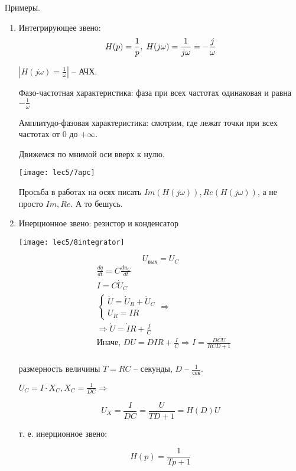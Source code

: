 \documentclass[main.tex]{subfiles}
\begin{document}
Примеры.

\begin{enumerate}[noitemsep]
	\item Интегрирующее звено:
    $$ H(p) = \frac{1}{p}, \thickspace H(j \omega) = \frac{1}{j \omega} = - \frac{j}{\omega} $$

    $|H(j \omega) = \frac{1}{\omega}|$ -- АЧХ.

    Фазо-частотная характеристика: фаза при всех частотах одинаковая и равна $ - \frac{1}{\omega} $

    Амплитудо-фазовая характеристика: смотрим, где лежат точки при всех частотах от $0$ до $ + \infty $.

    Движемся по мнимой оси вверх к нулю.

	\texttt{[image: lec5/7apc]}

	\begin{leftbar}
		Просьба в работах на осях писать $ Im(H(j\omega)), Re(H(j\omega))  $, а не просто $ Im, Re $.
        А то бешусь.
	\end{leftbar}

	\item Инерционное звено: резистор и конденсатор

	\texttt{[image: lec5/8integrator]}

	$$ U_{\text{вых}} = U_C $$
	\begin{align*}
		& \frac{dq}{dt} = C\frac{du_C}{dt} \\
		& I = C \dot U_C \\
		& \begin{cases}
            \dot U = \dot U_R + \dot U_C \\
            U_R = IR
        \end{cases}
          \Rightarrow\\
        & \Rightarrow \dot U = \dot I R + \frac{I}{C} \\
		& \text{Иначе, } DU = DIR + \frac{I}{C} \Rightarrow I = \frac{DCU}{RCD + 1} \\
	\end{align*}

    размерность величины $ T = RC $ -- секунды, $ D $ -- $ \frac{1}{\text{сек}} $.

    $ U_C = I \cdot X_C,  X_C = \frac{1}{DC} \Rightarrow $

    $$ U_X = \frac{I}{DC} = \frac{U}{TD + 1} = H(D) U $$

    т. е. инерционное звено:

	$$ \boxed{H(p) = \frac{1}{Tp + 1}} $$


\end{enumerate}
\end{document}
